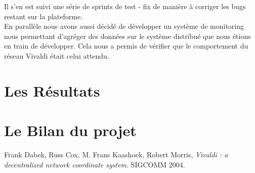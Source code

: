 \documentclass[11pt,a4paper]{article}
\begin{document}
Il s'en est suivi une série de sprints de test - fix de manière à corriger les bugs restant sur la plateforme.\\

En parallèle nous avons aussi décidé de développer un système de monitoring nous permettant d'agréger des données sur le système distribué que nous étions en train de développer. Cela nous a permis de vérifier que le comportement du réseau Vivaldi était celui attendu.

\section{Les Résultats}

\section{Le Bilan du projet}

\begin{thebibliography}{9}

  Frank Dabek, Russ Cox, M. Frans Kaashoek, Robert Morris,
  \emph{Vivaldi : a decentralized network coordinate system}.
  SIGCOMM 2004.

\end{thebibliography}
\end{document}
